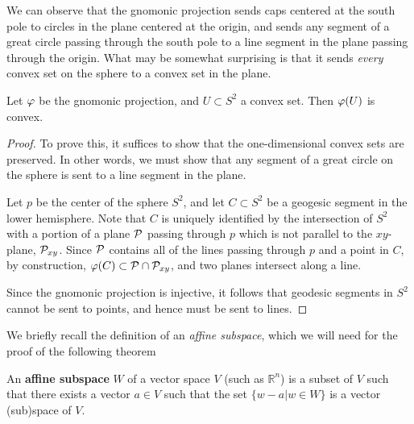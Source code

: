 We can observe that the gnomonic projection sends caps centered at the
south pole to circles in the plane centered at the origin, and sends
any segment of a great circle passing through the south pole to a line
segment in the plane passing through the origin.  What may be somewhat
surprising is that it sends \textit{every} convex set on the sphere to
a convex set in the plane.

\begin{lemma} \label{lem:gnomonic_convex}
  Let $\varphi$ be the gnomonic projection, and $U\subset S^2$ a convex 
  set. Then $\varphi(U)$ is convex.
\end{lemma}
\begin{proof}
  To prove this, it suffices to show that the one-dimensional convex
  sets are preserved. In other words, we must show that any segment of 
  a great circle on the sphere is sent to a line segment in the plane.

  Let $p$ be the center of the sphere $S^2$, and let $C\subset S^2$ be
  a geogesic segment in the lower hemisphere.  Note that $C$ is uniquely
  identified by the intersection of $S^2$ with a portion of a plane
  $\mathcal{P}$ passing through $p$ which is not parallel to the $xy$-plane,  $\mathcal{P}_{xy}$. Since $\mathcal{P}$ contains all of the lines passing through $p$ and a point in $C$, by construction, $\varphi(C)\subset \mathcal{P}\cap
  \mathcal{P}_{xy}$, and two planes intersect along a line. 

  Since the gnomonic projection is injective, it follows that 
  geodesic segments in $S^2$ cannot be sent to points, and hence 
  must be sent to lines. 
\end{proof}


We briefly recall the definition of an \textit{affine subspace}, which we will need for the proof of the following theorem
\begin{definition}
	An \textbf{affine subspace} $W$ of a vector space $V$ (such as $\mathbb{R}^n$) is a subset of $V$ such that there exists a vector $a\in V$ such that the set $\{w-a \vert w\in W \}$ is a vector (sub)space of $V$.
\end{definition}


